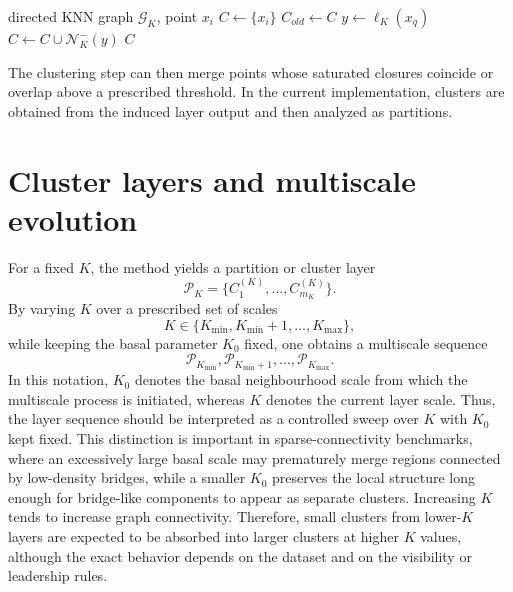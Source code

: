 \documentclass[pdflatex,sn-mathphys-num]{sn-jnl}
\newcommand{\calG}{\mathcal{G}}
\newcommand{\calN}{\mathcal{N}}
\newcommand{\calP}{\mathcal{P}}
\begin{document}
\begin{algorithm}[t]
\caption{Leadership-driven round-trip closure for one point}
\label{alg:closure}
\begin{algorithmic}[1]
\Require directed KNN graph $\calG_K$, point $x_i$
\State $C \gets \{x_i\}$
\Repeat
    \State $C_{old}\gets C$
        \State $y\gets \ell_K(x_q)$
        \State $C\gets C\cup\calN_K^-(y)$
    \EndFor
{}
\State \Return $C$
\end{algorithmic}
\end{algorithm}

The clustering step can then merge points whose saturated closures coincide or overlap above a prescribed threshold. In the current implementation, clusters are obtained from the induced layer output and then analyzed as partitions.

\section{Cluster layers and multiscale evolution}\label{sec:layers}

For a fixed $K$, the method yields a partition or cluster layer
\begin{equation}
\calP_K=\{C_1^{(K)},\ldots,C_{m_K}^{(K)}\}.
\end{equation}
By varying $K$ over a prescribed set of scales
\begin{equation}
K\in\{K_{\min},K_{\min}+1,\ldots,K_{\max}\},
\end{equation}
while keeping the basal parameter $K_0$ fixed, one obtains a multiscale sequence
\begin{equation}
\calP_{K_{\min}},\calP_{K_{\min}+1},\ldots,\calP_{K_{\max}}.
\end{equation}
In this notation, $K_0$ denotes the basal neighbourhood scale from which the multiscale process is initiated, whereas $K$ denotes the current layer scale. Thus, the layer sequence should be interpreted as a controlled sweep over $K$ with $K_0$ kept fixed. This distinction is important in sparse-connectivity benchmarks, where an excessively large basal scale may prematurely merge regions connected by low-density bridges, while a smaller $K_0$ preserves the local structure long enough for bridge-like components to appear as separate clusters.
Increasing $K$ tends to increase graph connectivity. Therefore, small clusters from lower-$K$ layers are expected to be absorbed into larger clusters at higher $K$ values, although the exact behavior depends on the dataset and on the visibility or leadership rules.
\end{document}
